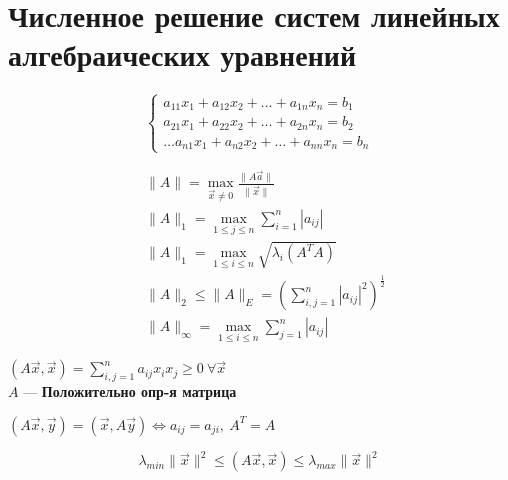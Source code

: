 \section{Численное решение систем линейных алгебраических уравнений}
\[
\begin{cases}
  a_{11}x_1 + a_{12}x_2 + \dots + a_{1n}x_n = b_1 \\
  a_{21}x_1 + a_{22}x_2 + \dots + a_{2n}x_n = b_2 \\
  \dots
  a_{n1}x_1 + a_{n2}x_2 + \dots + a_{nn}x_n = b_n
\end{cases}
\]


\begin{align*}
 &\|A\| = \max_{\vec{x} \neq 0} \frac{\|A \vec{a}\|}{\|\vec{x}\|} \\
 &\|A\|_1 = \max_{1 \leq j \leq n} \sum_{i = 1}^n |a_{ij}| \\
 &\|A\|_1 = \max_{1 \leq i \leq n} \sqrt{\lambda_i (A^T A)} \\ 
 &\|A\|_2 \leq \|A\|_E = (\sum_{i,j = 1}^n |a_{ij}|^2)^{\frac 12} \\
 &\|A\|_\infty  = \max_{1 \leq i \leq n} \sum_{j = 1}^n |a_{ij}|
\end{align*}

\begin{defn}
  $(A\vec{x}, \vec{x}) = \sum\limits_{i, j = 1}^n a_{ij}x_ix_j \geq 0\ \forall
  \vec{x}$ \\
  $A$ --- \textbf{Положительно опр-я матрица}
\end{defn}

\begin{defn}
  $(A\vec{x}, \vec{y}) = (\vec{x}, A\vec{y}) \iff a_{ij} = a_{ji},\ A^T = A$
\end{defn}

\[
  \lambda_{min} \|\vec{x}\|^2 \leq (A\vec{x}, \vec{x}) \leq \lambda_{max} \|\vec{x}\|^2
\]
